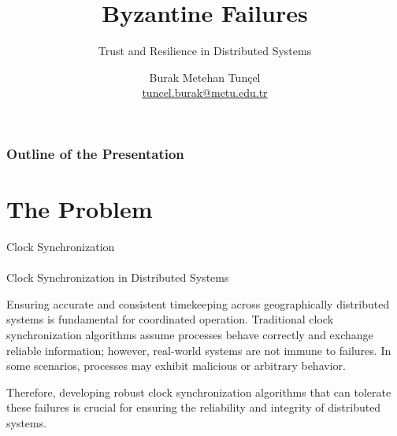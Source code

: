 \documentclass[11pt]{beamer}              %
\author[Burak Metehan Tunçel]{Burak Metehan Tunçel\\\href{mailto:tuncel.burak@metu.edu.tr}{tuncel.burak@metu.edu.tr}}
\title[WINS Beamer Template]{Byzantine Failures}
\subtitle[Short SubTitle]{Trust and Resilience in Distributed Systems}
\begin{document}
\begin{frame}[plain]
\titlepage
{}
\end{frame}

\begin{frame}[label=toc]
    \frametitle{Outline of the Presentation}
    \tableofcontents[subsubsectionstyle=hide]
\end{frame}
%
%
\section{The Problem}

\begin{frame}{Clock Synchronization}
\framesubtitle{}
\begin{block}{Clock Synchronization in Distributed Systems} 

Ensuring accurate and consistent timekeeping across geographically distributed systems is fundamental for coordinated operation. Traditional clock synchronization algorithms assume processes behave correctly and exchange reliable information; however, real-world systems are not immune to failures. In some scenarios, processes may exhibit malicious or arbitrary behavior.

Therefore, developing robust clock synchronization algorithms that can tolerate these failures is crucial for ensuring the reliability and integrity of distributed systems.
\end{block}

\note{}
\end{frame}
\end{document}
